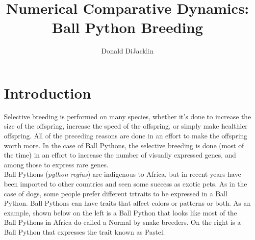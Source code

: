 \documentclass{article}
\begin{document}
\newcommand*{\be}{\mathbb{E}}
\newcommand*{\bv}{\mathbb{V}}
\lstset{showspaces = false, showstringspaces = false}
\linespread{2}
\title{Numerical Comparative Dynamics: Ball Python Breeding}
\author{Donald DiJacklin}
\maketitle
\section*{Introduction}
	\indent\indent Selective breeding is performed on many species, whether it's done to increase the size of the offspring, increase the speed of the offspring, or simply make healthier offspring. All of the preceding reasons are done in an effort to make the offspring worth more. In the case of Ball Pythons, the selective breeding is done (most of the time) in an effort to increase the number of visually expressed genes, and among those to express rare genes.\\
	\indent Ball Pythons (\textit{python regius}) are indigenous to Africa, but in recent years have been imported to other countries and seen some success as exotic pets. As in the case of dogs, some people prefer different trtraits to be expressed in a Ball Python. Ball Pythons can have traits that affect colors or patterns or both. As an example, shown below on the left is a Ball Python that looks like most of the Ball Pythons in Africa do called a Normal by snake breeders. On the right is a Ball Python that expresses the trait known as Pastel.
\end{document}
